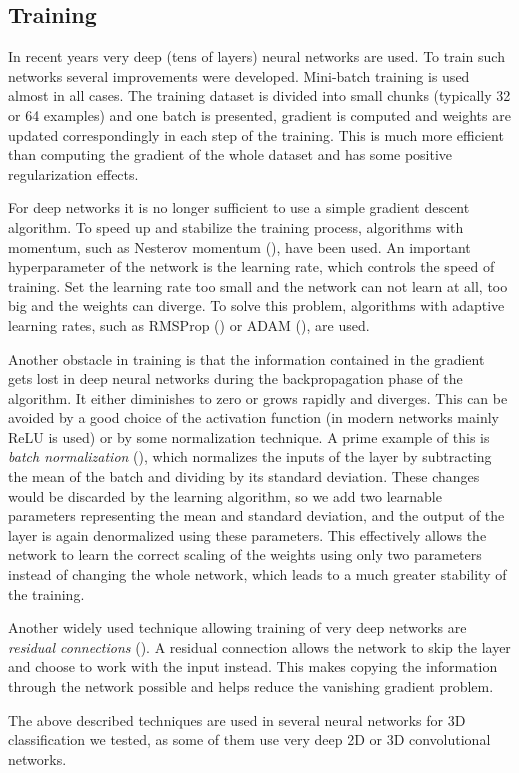 \subsection{Training}
\label{sec:training}
In recent years very deep (tens of layers) neural networks are used. To train such networks several improvements were developed. Mini-batch training is used almost in all cases. The training dataset is divided into small chunks (typically 32 or 64 examples) and one batch is presented, gradient is computed and weights are updated correspondingly in each step of the training. This is much more efficient than computing the gradient of the whole dataset and has some positive regularization effects. \par
For deep networks it is no longer sufficient to use a simple gradient descent algorithm. To speed up and stabilize the training process, algorithms with momentum, such as Nesterov momentum (\cite{sutskever_importance_2013}), have been used. An important hyperparameter of the network is the learning rate, which controls the speed of training. Set the learning rate too small and the network can not learn at all, too big and the weights can diverge. To solve this problem, algorithms with adaptive learning rates, such as 
RMSProp (\cite{hinton_neural_nodate}) or ADAM (\cite{kingma_adam:_2014}), are used. \par
Another obstacle in training is that the information contained in the gradient gets lost in deep neural networks during the backpropagation phase of the algorithm. It either diminishes to zero or grows rapidly and diverges. This can be avoided by a good choice of the activation function (in modern networks mainly ReLU is used) or by some normalization technique. A prime example of this is \textit{batch normalization} (\cite{ioffe_batch_2015}), which normalizes the inputs of the layer by subtracting the mean of the batch and dividing by its standard deviation. These changes would be discarded by the learning algorithm, so we add two learnable parameters representing the mean and standard deviation, and the output of the layer is again denormalized using these parameters. This effectively allows the network to learn the correct scaling of the weights using only two parameters instead of changing the whole network, which leads to a much greater stability of the training.\par
Another widely used technique allowing training of very deep networks are \textit{residual connections} (\cite{szegedy_inception-v4_2016}). A residual connection allows the network to skip the layer and choose to work with the input instead. This makes copying the information through the network possible and helps reduce the vanishing gradient problem. \par
The above described techniques are used in several neural networks for 3D classification we tested, as some of them use very deep 2D or 3D convolutional networks.

